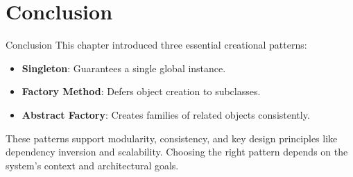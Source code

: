 \documentclass[aspectratio=169, table]{beamer}
\begin{document}
\section{Conclusion}

\begin{frame}[fragile]{Conclusion}
	\vspace{20pt}
	This chapter introduced three essential creational patterns:
	
	\vspace{10pt}
	\begin{itemize}
		\item \textbf{Singleton}: Guarantees a single global instance.
		\item \textbf{Factory Method}: Defers object creation to subclasses.
		\item \textbf{Abstract Factory}: Creates families of related objects consistently.
	\end{itemize}
	
	\vspace{10pt}
	These patterns support modularity, consistency, and key design principles like dependency inversion and scalability. Choosing the right pattern depends on the system’s context and architectural goals.
\end{frame}
\end{document}
